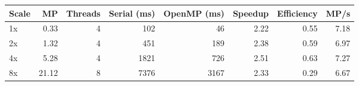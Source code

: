 \begin{tabular}{lrrrrrrr}
\toprule
Scale & MP & Threads & Serial (ms) & OpenMP (ms) & Speedup & Efficiency & MP/s \\
\midrule
1x & 0.33 & 4 & 102 & 46 & 2.22 & 0.55 & 7.18 \\
2x & 1.32 & 4 & 451 & 189 & 2.38 & 0.59 & 6.97 \\
4x & 5.28 & 4 & 1821 & 726 & 2.51 & 0.63 & 7.27 \\
8x & 21.12 & 8 & 7376 & 3167 & 2.33 & 0.29 & 6.67 \\
\bottomrule
\end{tabular}
